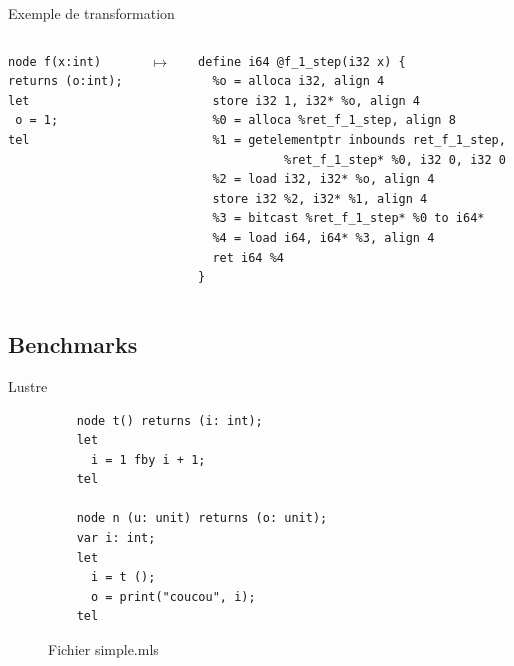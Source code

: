 \documentclass{beamer} %
\begin{document}
\begin{frame}[fragile]{Exemple de transformation}
    \begin{columns}
    \begin{column}{0.25\textwidth}
    \begin{verbatim}
node f(x:int)
returns (o:int);
let
 o = 1;
tel
   \end{verbatim}
    \end{column}
    \begin{column}{0.05\textwidth}
        $\mapsto$
    \end{column}
    \begin{column}{0.70\textwidth}  %
    \begin{verbatim}
define i64 @f_1_step(i32 x) {
  %o = alloca i32, align 4
  store i32 1, i32* %o, align 4
  %0 = alloca %ret_f_1_step, align 8
  %1 = getelementptr inbounds ret_f_1_step,
            %ret_f_1_step* %0, i32 0, i32 0
  %2 = load i32, i32* %o, align 4
  store i32 %2, i32* %1, align 4
  %3 = bitcast %ret_f_1_step* %0 to i64*
  %4 = load i64, i64* %3, align 4
  ret i64 %4
}
   \end{verbatim}
    \end{column}
    \end{columns}
\end{frame}

\subsection{Benchmarks}

\begin{frame}[fragile]{Lustre}
    \begin{figure}
        \begin{verbatim}
    node t() returns (i: int);
    let
      i = 1 fby i + 1;
    tel

    node n (u: unit) returns (o: unit);
    var i: int;
    let
      i = t ();
      o = print("coucou", i);
    tel
        \end{verbatim}
        \caption{Fichier simple.mls}
    \end{figure}

\end{frame}
\end{document}
